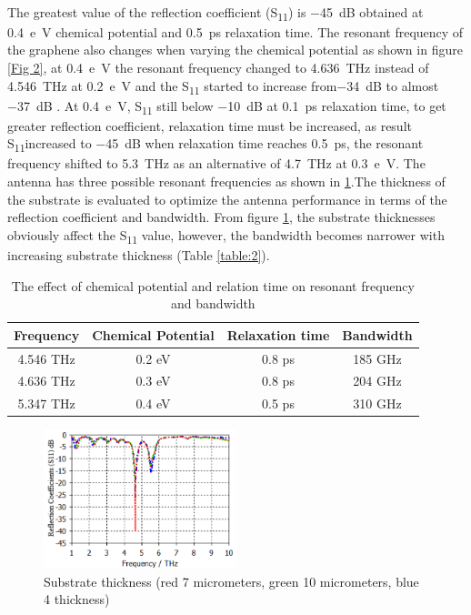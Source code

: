 \documentclass[12pt]{suhbook}
\begin{document}
\\The greatest value of the reflection coefficient (\si{S_{11}}) is \SI{-45}{\deci\bel} obtained at \SI{0.4}{e \volt} chemical potential and \SI{0.5}{\pico \second } relaxation time. The resonant frequency of the graphene also changes when varying the chemical potential as shown in figure \ref{Fig 2}, at \SI{0.4}{e \volt} the resonant frequency changed to \SI{4.636}{\THz} instead of \SI{4.546}{\THz} at \SI{0.2}{e \volt} and the \si{S_{11}} started to increase from\SI{-34}{\deci\bel} to almost \SI{-37}{\deci\bel} . At \SI{0.4}{e \volt}, \si{S_{11}} still below \SI{-10}{\deci\bel} at \SI{0.1}{\pico \second } relaxation time, to get greater reflection coefficient, relaxation time must be increased, as result \si{S_{11}}increased to \SI{-45}{\deci\bel} when relaxation time reaches \SI{0.5}{\pico \second }, the resonant frequency shifted to \SI{5.3}{\THz} as an alternative of \SI{4.7}{\THz} at \SI{0.3}{e \volt}. The antenna has three possible resonant frequencies as shown in \ref{table:1}.The thickness of the substrate is evaluated to optimize the antenna performance in terms of the reflection coefficient and bandwidth. From figure \ref{Fig 3}, the substrate thicknesses obviously affect the \si{S_{11}} value, however, the bandwidth becomes narrower with increasing substrate thickness (Table \ref{table:2}).
\begin{table}[hbt!]
\centering
 \begin{tabular}[hbt!]{||c c c c||} 
 \hline
 Frequency & Chemical Potential & Relaxation time & Bandwidth \\ [0.5ex] 
 \hline\hline
 4.546 THz & 0.2 eV & 0.8 ps & 185 GHz \\ 
 \hline
 4.636 THz & 0.3 eV & 0.8 ps & 204 GHz \\
 \hline
 5.347 THz & 0.4 eV & 0.5 ps & 310 GHz \\[1ex] 
 \hline
\end{tabular}
\caption{The effect of chemical potential and relation time on resonant frequency and bandwidth}
\label{table:1}
\end{table}
\begin{figure}[hbt!]
    \centering
    \includegraphics[width=0.5\textwidth]{3}
    \caption{Substrate thickness (red 7 micrometers, green 10 micrometers, blue 4 thickness)}
    \label{Fig 3}
\end{figure}
\end{document}
